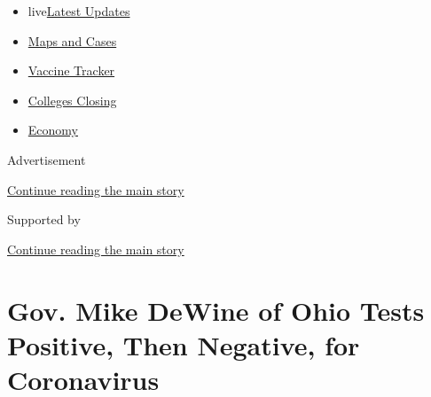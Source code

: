 \begin{itemize}
\tightlist
\item
  live\href{https://www.nytimes3xbfgragh.onion/2020/08/20/world/coronavirus-covid.html?name=styln-coronavirus-national\&region=TOP_BANNER\&variant=undefined\&block=storyline_menu_recirc\&action=click\&pgtype=Article\&impression_id=b95e2bd0-e38a-11ea-bf7b-edaacc4ea387}{Latest
  Updates}
\item
  \href{https://www.nytimes3xbfgragh.onion/interactive/2020/us/coronavirus-us-cases.html?name=styln-coronavirus-national\&region=TOP_BANNER\&variant=undefined\&block=storyline_menu_recirc\&action=click\&pgtype=Article\&impression_id=b95e2bd1-e38a-11ea-bf7b-edaacc4ea387}{Maps
  and Cases}
\item
  \href{https://www.nytimes3xbfgragh.onion/interactive/2020/science/coronavirus-vaccine-tracker.html?name=styln-coronavirus-national\&region=TOP_BANNER\&variant=undefined\&block=storyline_menu_recirc\&action=click\&pgtype=Article\&impression_id=b95e2bd2-e38a-11ea-bf7b-edaacc4ea387}{Vaccine
  Tracker}
\item
  \href{https://www.nytimes3xbfgragh.onion/2020/08/19/us/colleges-closing-covid.html?name=styln-coronavirus-national\&region=TOP_BANNER\&variant=undefined\&block=storyline_menu_recirc\&action=click\&pgtype=Article\&impression_id=b95e2bd3-e38a-11ea-bf7b-edaacc4ea387}{Colleges
  Closing}
\item
  \href{https://www.nytimes3xbfgragh.onion/live/2020/08/20/business/stock-market-today-coronavirus?name=styln-coronavirus-national\&region=TOP_BANNER\&variant=undefined\&block=storyline_menu_recirc\&action=click\&pgtype=Article\&impression_id=b95e2bd4-e38a-11ea-bf7b-edaacc4ea387}{Economy}
\end{itemize}

Advertisement

\protect\hyperlink{after-top}{Continue reading the main story}

Supported by

\protect\hyperlink{after-sponsor}{Continue reading the main story}

\hypertarget{gov-mike-dewine-of-ohio-tests-positive-then-negative-for-coronavirus}{%
\section{Gov. Mike DeWine of Ohio Tests Positive, Then Negative, for
Coronavirus}\label{gov-mike-dewine-of-ohio-tests-positive-then-negative-for-coronavirus}}

